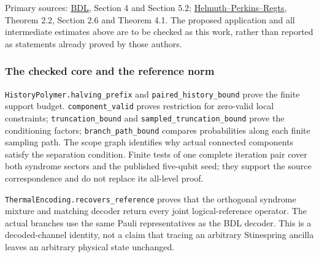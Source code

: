 \documentclass[
]{article}
\begin{document}
Primary sources: \href{https://arxiv.org/abs/2605.10943}{BDL}, Section 4
and Section 5.2;
\href{https://arxiv.org/abs/1806.11548}{Helmuth--Perkins--Regts},
Theorem 2.2, Section 2.6 and Theorem 4.1. The proposed application and
all intermediate estimates above are to be checked as this work, rather
than reported as statements already proved by those authors.

\subsubsection{The checked core and the reference
norm}\label{the-checked-core-and-the-reference-norm}

\texttt{H\allowbreak{}i\allowbreak{}s\allowbreak{}t\allowbreak{}o\allowbreak{}r\allowbreak{}y\allowbreak{}P\allowbreak{}o\allowbreak{}l\allowbreak{}y\allowbreak{}m\allowbreak{}e\allowbreak{}r\allowbreak{}.\allowbreak{}h\allowbreak{}a\allowbreak{}l\allowbreak{}v\allowbreak{}i\allowbreak{}n\allowbreak{}g\allowbreak{}\_\allowbreak{}p\allowbreak{}r\allowbreak{}e\allowbreak{}f\allowbreak{}i\allowbreak{}x}
and
\texttt{p\allowbreak{}a\allowbreak{}i\allowbreak{}r\allowbreak{}e\allowbreak{}d\allowbreak{}\_\allowbreak{}h\allowbreak{}i\allowbreak{}s\allowbreak{}t\allowbreak{}o\allowbreak{}r\allowbreak{}y\allowbreak{}\_\allowbreak{}b\allowbreak{}o\allowbreak{}u\allowbreak{}n\allowbreak{}d}
prove the finite support budget. \texttt{component\_valid} proves
restriction for zero-valid local constraints; \texttt{truncation\_bound}
and
\texttt{s\allowbreak{}a\allowbreak{}m\allowbreak{}p\allowbreak{}l\allowbreak{}e\allowbreak{}d\allowbreak{}\_\allowbreak{}t\allowbreak{}r\allowbreak{}u\allowbreak{}n\allowbreak{}c\allowbreak{}a\allowbreak{}t\allowbreak{}i\allowbreak{}o\allowbreak{}n\allowbreak{}\_\allowbreak{}b\allowbreak{}o\allowbreak{}u\allowbreak{}n\allowbreak{}d}
prove the conditioning factors;
\texttt{b\allowbreak{}r\allowbreak{}a\allowbreak{}n\allowbreak{}c\allowbreak{}h\allowbreak{}\_\allowbreak{}p\allowbreak{}a\allowbreak{}t\allowbreak{}h\allowbreak{}\_\allowbreak{}b\allowbreak{}o\allowbreak{}u\allowbreak{}n\allowbreak{}d}
compares probabilities along each finite sampling path. The scope graph
identifies why actual connected components satisfy the separation
condition. Finite tests of one complete iteration pair cover both
syndrome sectors and the published five-qubit seed; they support the
source correspondence and do not replace its all-level proof.

\texttt{T\allowbreak{}h\allowbreak{}e\allowbreak{}r\allowbreak{}m\allowbreak{}a\allowbreak{}l\allowbreak{}E\allowbreak{}n\allowbreak{}c\allowbreak{}o\allowbreak{}d\allowbreak{}i\allowbreak{}n\allowbreak{}g\allowbreak{}.\allowbreak{}r\allowbreak{}e\allowbreak{}c\allowbreak{}o\allowbreak{}v\allowbreak{}e\allowbreak{}r\allowbreak{}s\allowbreak{}\_\allowbreak{}r\allowbreak{}e\allowbreak{}f\allowbreak{}e\allowbreak{}r\allowbreak{}e\allowbreak{}n\allowbreak{}c\allowbreak{}e}
proves that the orthogonal syndrome mixture and matching decoder return
every joint logical-reference operator. The actual branches use the same
Pauli representatives as the BDL decoder. This is a decoded-channel
identity, not a claim that tracing an arbitrary Stinespring ancilla
leaves an arbitrary physical state unchanged.
\end{document}
